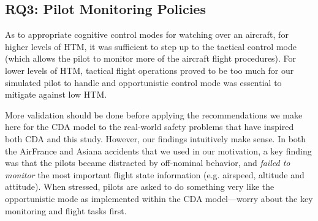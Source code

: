 \documentclass[journal]{IEEEtran}
\newenvironment{changed}{\par}{\par}
\begin{document}
\subsection{RQ3: Pilot Monitoring Policies}

As to appropriate cognitive control modes for watching over an aircraft, for higher levels of HTM, it was sufficient to step up to the tactical control mode (which allows the pilot to monitor more of the aircraft flight procedures).
For lower levels of HTM, tactical flight operations proved to be too much for our
simulated pilot to handle and opportunistic control mode was essential to mitigate against low HTM.

\begin{changed}
More validation should be done before applying the recommendations we make here for the CDA model to the real-world safety problems that have inspired both CDA and this study.
However, our findings intuitively make sense.
In both the AirFrance and Asiana accidents that we used in our motivation, a key finding was that the pilots became distracted by off-nominal behavior, and {\em failed to monitor} the most important flight state information (e.g. airspeed, altitude and attitude).
When stressed, pilots are asked to do something very like the opportunistic mode as implemented within the CDA model---worry about the key monitoring and flight tasks first.
\end{changed}



\end{document}
